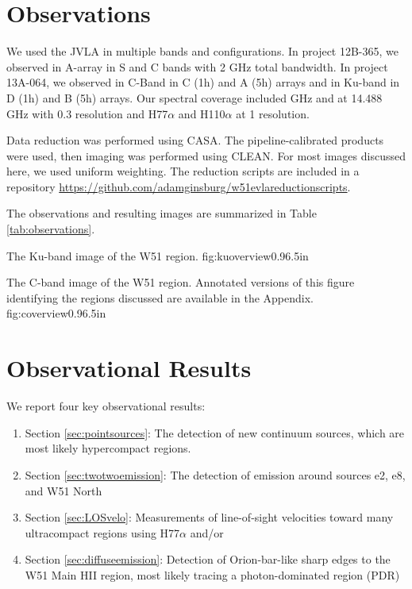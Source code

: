 \section{Observations}
We used the JVLA in multiple bands and configurations.  In project 12B-365, we
observed in A-array in S and C bands with 2 GHz total bandwidth.  In project
13A-064, we observed in C-Band in C (1h) and A (5h) arrays and in Ku-band in D
(1h) and B (5h) arrays.  Our spectral coverage included \ortho {} GHz
and \twotwo at 14.488 GHz with 0.3 \kms resolution and H77$\alpha$ and H110$\alpha$
at 1 \kms resolution.

Data reduction was performed using CASA.  The pipeline-calibrated products were
used, then imaging was performed using CLEAN.  For most images discussed here, we
used uniform weighting.  The reduction scripts are included in a repository
\url{https://github.com/adamginsburg/w51evlareductionscripts}.

The observations and resulting images are summarized in Table
\ref{tab:observations}.




{The Ku-band image of the W51 region.}
{fig:kuoverview}{0.9}{6.5in}

{The C-band image of the W51 region.  Annotated versions of this figure
identifying the regions discussed are available in the Appendix.}
{fig:coverview}{0.9}{6.5in}

\section{Observational Results}
We report four key observational results: 
\begin{enumerate}
    \item Section \ref{sec:pointsources}: The detection of new continuum
        sources, which are most likely hypercompact \hii regions. 
    \item Section \ref{sec:twotwoemission}: The detection of \formaldehyde
        \twotwo emission around sources e2, e8, and W51 North
    \item Section \ref{sec:LOSvelo}: Measurements of line-of-sight velocities
        toward many ultracompact \hii regions using H77$\alpha$ and/or
        \formaldehyde
    \item Section \ref{sec:diffuseemission}: Detection of Orion-bar-like sharp
        edges to the W51 Main HII region, most likely tracing a
        photon-dominated region (PDR)
\end{enumerate}


